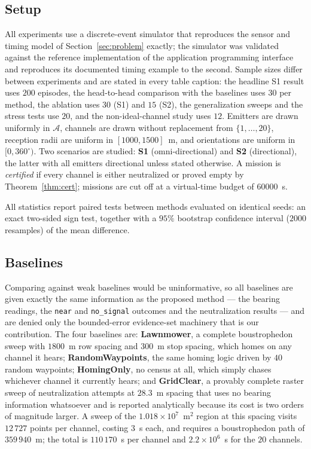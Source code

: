 \documentclass[journal,10pt]{IEEEtran}
\theoremstyle{definition}
\newcommand{\bA}{\mathcal{A}}
\begin{document}
\subsection{Setup}
All experiments use a discrete-event simulator that reproduces the sensor and timing model of
Section~\ref{sec:problem} exactly; the simulator was validated against the reference
implementation of the application programming interface and reproduces its documented timing
example to the second. Sample sizes differ between experiments and are stated in every table caption: the headline
S1 result uses $200$ episodes, the head-to-head comparison with the baselines uses $30$ per method,
the ablation uses $30$ (S1) and $15$ (S2), the generalization sweeps and the stress tests use $20$,
and the non-ideal-channel study uses $12$. Emitters are drawn uniformly in $\bA$, channels are
drawn without replacement from $\{1,\dots,20\}$, reception radii are uniform in $[1000,1500]$~m,
and orientations are uniform in $[0,360^\circ)$. Two scenarios are studied: \textbf{S1}
(omni-directional) and \textbf{S2} (directional), the latter with all emitters directional unless
stated otherwise. A mission is \emph{certified} if every channel is either neutralized or proved
empty by Theorem~\ref{thm:cert}; missions are cut off at a virtual-time budget of $60000$~s.

All statistics report paired tests between methods evaluated on identical seeds: an exact
two-sided sign test, together with a $95\%$ bootstrap confidence interval ($2000$ resamples) of
the mean difference.

\subsection{Baselines}
\label{sec:maincmp}
Comparing against weak baselines would be uninformative, so all baselines are given exactly the
same information as the proposed method --- the bearing readings, the \texttt{near} and
\texttt{no\_signal} outcomes and the neutralization results --- and are denied only the
bounded-error evidence-set machinery that is our contribution. The four baselines are:
\textbf{Lawnmower}, a complete boustrophedon sweep with $1800$~m row spacing and $300$~m stop
spacing, which homes on any channel it hears; \textbf{RandomWaypoints}, the same homing logic
driven by $40$ random waypoints; \textbf{HomingOnly}, no census at all, which simply chases
whichever channel it currently hears; and \textbf{GridClear}, a provably complete raster sweep of
neutralization attempts at $28.3$~m spacing that uses no bearing information whatsoever and is
reported analytically because its cost is two orders of magnitude larger. A sweep of the
$1.018\times10^7$~m$^2$ region at this spacing visits $12\,727$ points per channel, costing
$3$~s each, and requires a boustrophedon path of $359\,940$~m; the total is
$110\,170$~s per channel and $2.2\times10^6$~s for the $20$ channels.
\end{document}
